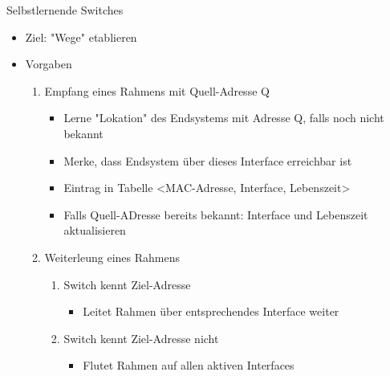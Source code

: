       Selbstlernende Switches
      \begin{itemize}
        \item Ziel: "Wege" etablieren
        \item Vorgaben
          \begin{enumerate}[label=\arabic*)]
            \item Empfang eines Rahmens mit Quell-Adresse Q
              \begin{itemize}
                \item Lerne "Lokation" des Endsystems mit Adresse Q, falls noch nicht bekannt
                \item Merke, dass Endsystem über dieses Interface erreichbar ist
                \item Eintrag in Tabelle <MAC-Adresse, Interface, Lebenszeit>
                \item Falls Quell-ADresse bereits bekannt: Interface und Lebenszeit aktualisieren
              \end{itemize}
            \item Weiterleung eines Rahmens
              \begin{enumerate}
                \item Switch kennt Ziel-Adresse
                  \begin{itemize}
                    \item Leitet Rahmen über entsprechendes Interface weiter
                  \end{itemize}
                \item Switch kennt Ziel-Adresse nicht
                  \begin{itemize}
                    \item Flutet Rahmen auf allen aktiven Interfaces
                  \end{itemize}
              \end{enumerate}
          \end{enumerate}
      \end{itemize}
